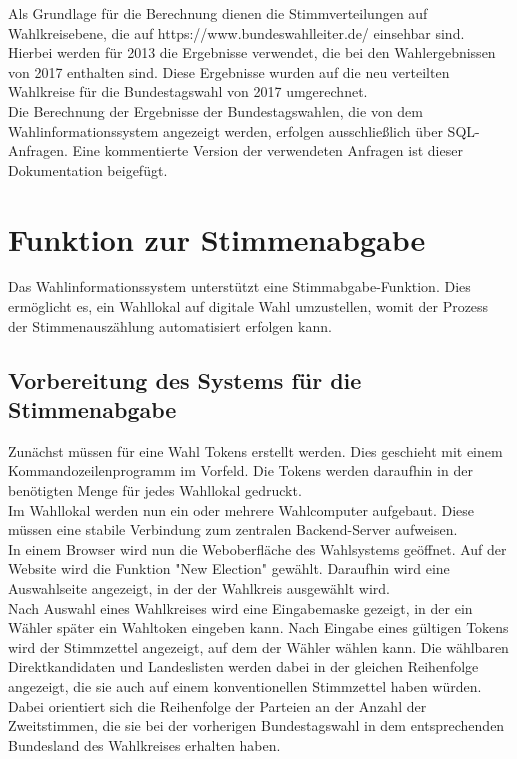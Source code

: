 \documentclass[a4paper]{scrreprt}
\begin{document}
Als Grundlage für die Berechnung dienen die Stimmverteilungen auf Wahlkreisebene, die auf https://www.bundeswahlleiter.de/ einsehbar sind. Hierbei werden für 2013 die Ergebnisse verwendet, die bei den Wahlergebnissen von 2017 enthalten sind. Diese Ergebnisse wurden auf die neu verteilten Wahlkreise für die Bundestagswahl von 2017 umgerechnet. \\

Die Berechnung der Ergebnisse der Bundestagswahlen, die von dem Wahlinformationssystem angezeigt werden, erfolgen ausschließlich über SQL-Anfragen. Eine kommentierte Version der verwendeten Anfragen ist dieser Dokumentation beigefügt. 


\section{Funktion zur Stimmenabgabe}

Das Wahlinformationssystem unterstützt eine Stimmabgabe-Funktion.
Dies ermöglicht es, ein Wahllokal auf digitale Wahl umzustellen, womit der Prozess der Stimmenauszählung automatisiert erfolgen kann.

\subsection{Vorbereitung des Systems für die Stimmenabgabe}

Zunächst müssen für eine Wahl Tokens erstellt werden.
Dies geschieht mit einem Kommandozeilenprogramm im Vorfeld.
Die Tokens werden daraufhin in der benötigten Menge für jedes Wahllokal gedruckt. \\

Im Wahllokal werden nun ein oder mehrere Wahlcomputer aufgebaut.
Diese müssen eine stabile Verbindung zum zentralen Backend-Server aufweisen. \\

In einem Browser wird nun die Weboberfläche des Wahlsystems geöffnet.
Auf der Website wird die Funktion "New Election" gewählt.
Daraufhin wird eine Auswahlseite angezeigt, in der der Wahlkreis ausgewählt wird.\\

Nach Auswahl eines Wahlkreises wird eine Eingabemaske gezeigt, in der ein Wähler später ein Wahltoken eingeben kann. Nach Eingabe eines gültigen Tokens wird der Stimmzettel angezeigt, auf dem der Wähler wählen kann. Die wählbaren Direktkandidaten und Landeslisten werden dabei in der gleichen Reihenfolge angezeigt, die sie auch auf einem konventionellen Stimmzettel haben würden. Dabei orientiert sich die Reihenfolge der Parteien an der Anzahl der Zweitstimmen, die sie bei der vorherigen Bundestagswahl in dem entsprechenden Bundesland des Wahlkreises erhalten haben. \\
\end{document}
